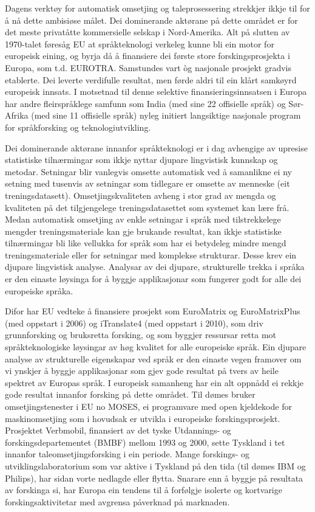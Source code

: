 \begin{multicols}{2}
Dagens verktøy for automatisk omsetjing og taleprosessering strekkjer ikkje til for å nå dette ambisiøse målet. Dei dominerande aktørane på dette området er for det meste privatåtte kommersielle selskap i Nord-Amerika. Alt på slutten av 1970-talet føresåg EU at språkteknologi verkeleg kunne bli ein motor for europeisk eining, og byrja då å finansiere dei første store forskingsprosjekta i Europa, som t.d. EUROTRA. Samstundes vart òg nasjonale prosjekt gradvis etablerte. Dei leverte verdifulle resultat, men førde aldri til ein klårt samkøyrd europeisk innsats. I motsetnad til denne selektive finansieringsinnsatsen i Europa har andre fleirspråklege samfunn som India (med sine 22 offisielle språk) og Sør-Afrika (med sine 11 offisielle språk) nyleg initiert langsiktige nasjonale program for språkforsking og teknologiutvikling. 

Dei dominerande aktørane innanfor språkteknologi er i dag avhengige av upresise statistiske tilnærmingar som ikkje nyttar djupare lingvistisk kunnskap og metodar. Setningar blir vanlegvis omsette automatisk ved å samanlikne ei ny setning med tusenvis av setningar som tidlegare er omsette av menneske (eit treningsdatasett). Omsetjingskvaliteten avheng i stor grad av mengda og kvaliteten på det tilgjengelege treningsdatasettet som systemet kan lære frå. Medan automatisk omsetjing av enkle setningar i språk med tilstrekkelege mengder treningsmateriale kan gje brukande resultat, kan ikkje statistiske tilnærmingar bli like vellukka for språk som har ei betydeleg mindre mengd treningsmateriale eller for setningar med komplekse strukturar. Desse krev ein djupare lingvistisk analyse. Analysar av dei djupare, strukturelle trekka i språka er den einaste løysinga for å byggje applikasjonar som fungerer godt for alle dei europeiske språka.


Difor har EU vedteke å finansiere prosjekt som EuroMatrix og EuroMatrixPlus (med oppstart i 2006) og iTranslate4 (med oppstart i 2010), som driv grunnforsking og bruksretta forsking, og som byggjer ressursar retta mot språkteknologiske løysingar av høg kvalitet for alle europeiske språk. Ein djupare analyse av strukturelle eigenskapar ved språk er den einaste vegen framover om vi ynskjer å byggje applikasjonar som gjev gode resultat på tvers av heile spektret av Europas språk. 
I europeisk samanheng har ein alt oppnådd ei rekkje gode resultat innanfor forsking på dette området. Til dømes bruker omsetjingstenester i EU no MOSES, ei programvare med open kjeldekode for maskinomsetjing som i hovudsak er utvikla i europeiske forskingsprosjekt. Prosjektet Verbmobil, finansiert av det tyske Utdannings- og forskingsdepartementet (BMBF) mellom 1993 og 2000, sette Tyskland i tet innanfor taleomsetjingsforsking i ein periode. Mange forskings- og utviklingslaboratorium som var aktive i Tyskland på den tida (til dømes IBM og Philips), har sidan vorte nedlagde eller flytta. Snarare enn å byggje på resultata av forskinga si, har Europa ein tendens til å forfølgje isolerte og kortvarige forskingsaktivitetar med avgrensa påverknad på marknaden.


\end{multicols}
